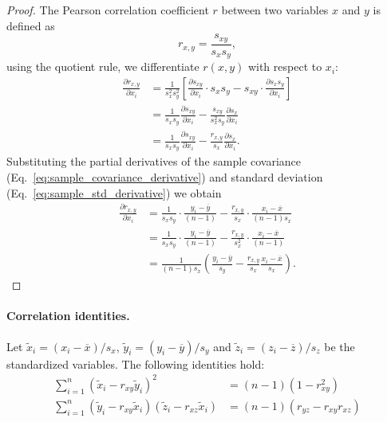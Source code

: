 \begin{proof}
    The Pearson correlation coefficient \(r\) between two variables \(x\) and \(y\)
    is defined as
    \[
        r_{x,y} = \frac{s_{xy}}{s_x s_y},
    \]
    using the quotient rule, we differentiate \(r(x,y)\) with respect to \(x_i\):
    \begin{align*}
        \frac{\partial r_{x,y}}{\partial x_i} & = \frac{1}{s_x^2 s_y^2}\left[\frac{\partial s_{xy}}{\partial x_i} \cdot s_x s_y - s_{xy} \cdot \frac{\partial s_x s_y}{\partial x_i}\right] \\
                                              & = \frac{1}{s_x s_y} \frac{\partial s_{xy}}{\partial x_i} - \frac{s_{xy}}{s_x^2 s_y} \frac{\partial s_x}{\partial x_i}                       \\
                                              & = \frac{1}{s_x s_y} \frac{\partial s_{xy}}{\partial x_i} - \frac{r_{x,y}}{s_x} \frac{\partial s_x}{\partial x_i}.
    \end{align*}
    Substituting the partial derivatives of the sample covariance (Eq.~\ref{eq:sample_covariance_derivative}) and standard deviation (Eq.~\ref{eq:sample_std_derivative}) we obtain
    \begin{align*}
        \frac{\partial r_{x,y}}{\partial x_i} & = \frac{1}{s_x s_y} \cdot \frac{y_i - \overline{y}}{(n-1)} - \frac{r_{x,y}}{s_x} \cdot \frac{x_i - \overline{x}}{(n-1)s_x} \\
                                              & = \frac{1}{s_x s_y} \cdot \frac{y_i - \overline{y}}{(n-1)} - \frac{r_{x,y}}{s_x^2} \cdot \frac{x_i - \overline{x}}{(n-1)}  \\
                                              & = \frac{1}{(n-1)s_x} \left( \frac{y_i - \overline{y}}{s_y} - \frac{r_{x,y}}{s_x} \frac{x_i - \overline{x}}{s_x} \right).
    \end{align*}
\end{proof}

\paragraph{Correlation identities.}

Let \(\tilde{x}_i = (x_i - \overline{x})/s_x\), \(\tilde{y}_i = (y_i -
\overline{y})/s_y\) and \(\tilde{z}_i = (z_i - \overline{z})/s_z\) be the
standardized variables. The following identities hold:
\begin{align}
    \sum_{i=1}^{n} {\left( \tilde{x}_i - r_{xy} \tilde{y}_i \right)}^{2}                                          & = (n-1)(1 - r_{xy}^2)          \\
    \sum_{i=1}^{n} \left( \tilde{y}_i - r_{xy} \tilde{x}_i \right)\left( \tilde{z}_i - r_{xz} \tilde{x}_i \right) & = (n-1)(r_{yz} - r_{xy}r_{xz})
    \label{eq:correlation_identities}
\end{align}

